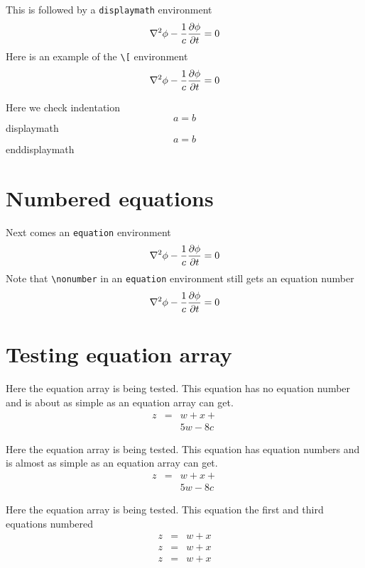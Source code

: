 \documentclass{article}
\begin{document}
This is followed by a \verb#displaymath# environment
\begin{displaymath}
\nabla^2 \phi -{1\over c} {\partial \phi\over \partial t}  = 0
\end{displaymath}
Here is an example of the \verb#\[# environment
\[
\nabla^2 \phi -{1\over c} {\partial \phi\over \partial t}  = 0
\]

\noindent 
Here we check indentation
\[ 
a=b 
\] 
displaymath 
\begin{displaymath} 
a=b 
\end{displaymath} 
enddisplaymath 


\section{Numbered equations}
Next comes an \verb#equation# environment
\begin{equation}
\nabla^2 \phi -{1\over c} {\partial \phi\over \partial t}  = 0
\end{equation}
Note that \verb#\nonumber# in an \verb#equation# environment still gets
an equation number
\begin{equation}
\nabla^2 \phi -{1\over c} {\partial \phi\over \partial t}  = 0 \nonumber
\end{equation}

\section{Testing equation array}

Here the equation array is being tested.  This equation has no equation number
and is about as simple as an equation array can get.
\begin{eqnarray*}
z & = & w + x + \\
  &   & 5w - 8c 
\end{eqnarray*}

Here the equation array is being tested.  This equation has equation numbers
and is almost as simple as an equation array can get.
\begin{eqnarray}
z & = & w + x + \\
  &   & 5w - 8c 
\end{eqnarray}

Here the equation array is being tested.  This equation the first and third equations numbered
\begin{eqnarray}
z & = & w + x  \\
z & = & w + x \nonumber\\
z & = & w + x  
\end{eqnarray}
\end{document}

